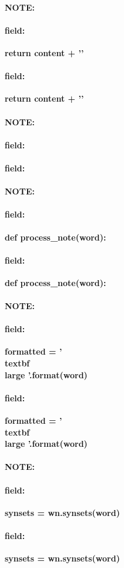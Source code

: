 \documentclass[12pt]{article}
\newenvironment{note}{\paragraph{NOTE:}}{}
\newenvironment{field}{\paragraph{field:}}{}
\begin{document}
\begin{note}
\begin{field}
\textbf{\large return content + '\n'}
\end{field}
\begin{field}
\textbf{\large return content + '\n'}
\begin{description}

\end{description}
\end{field}
\end{note}
\begin{note}
\begin{field}
\textbf{\large }
\end{field}
\begin{field}
\textbf{\large }
\begin{description}

\end{description}
\end{field}
\end{note}
\begin{note}
\begin{field}
\textbf{\large def process_note(word):}
\end{field}
\begin{field}
\textbf{\large def process_note(word):}
\begin{description}

\end{description}
\end{field}
\end{note}
\begin{note}
\begin{field}
\textbf{\large formatted = '\\textbf{{\\large {}}}'.format(word)}
\end{field}
\begin{field}
\textbf{\large formatted = '\\textbf{{\\large {}}}'.format(word)}
\begin{description}

\end{description}
\end{field}
\end{note}
\begin{note}
\begin{field}
\textbf{\large synsets = wn.synsets(word)}
\end{field}
\begin{field}
\textbf{\large synsets = wn.synsets(word)}
\begin{description}

\end{description}
\end{field}
\end{note}
\end{document}
